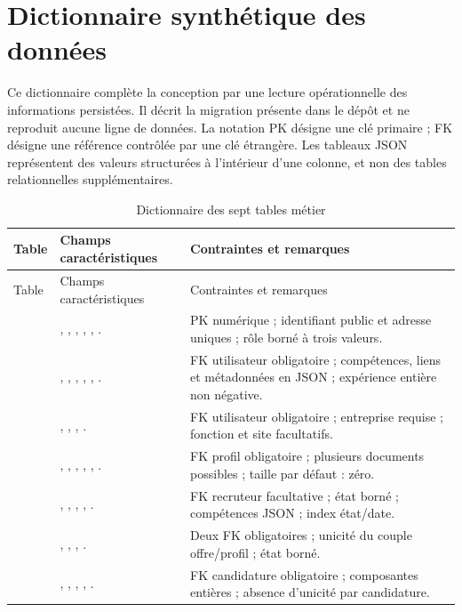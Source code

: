 \chapter{Dictionnaire synthétique des données}
\label{ann:dictionnaire}

Ce dictionnaire complète la conception par une lecture opérationnelle des informations persistées. Il décrit la migration présente dans le dépôt et ne reproduit aucune ligne de données. La notation PK désigne une clé primaire ; FK désigne une référence contrôlée par une clé étrangère. Les tableaux JSON représentent des valeurs structurées à l'intérieur d'une colonne, et non des tables relationnelles supplémentaires.

\begingroup
\small
\begin{longtable}{@{}P{0.27\textwidth}P{0.31\textwidth}P{0.34\textwidth}@{}}
\caption{Dictionnaire des sept tables métier}\label{tab:ann-dictionnaire}\\
\toprule
Table & Champs caractéristiques & Contraintes et remarques \\
\midrule
\endfirsthead
\toprule
Table & Champs caractéristiques & Contraintes et remarques \\
\midrule
\endhead
{} & , , , , , . & PK numérique ; identifiant public et adresse uniques ; rôle borné à trois valeurs. \\
 & , , , , , . & FK utilisateur obligatoire ; compétences, liens et métadonnées en JSON ; expérience entière non négative. \\
 & , , , . & FK utilisateur obligatoire ; entreprise requise ; fonction et site facultatifs. \\
 & , , , , , . & FK profil obligatoire ; plusieurs documents possibles ; taille par défaut : zéro. \\
 & , , , , . & FK recruteur facultative ; état borné ; compétences JSON ; index état/date. \\
 & , , , . & Deux FK obligatoires ; unicité du couple offre/profil ; état borné. \\
 & , , , , . & FK candidature obligatoire ; composantes entières ; absence d'unicité par candidature. \\
\bottomrule
\end{longtable}
\endgroup

